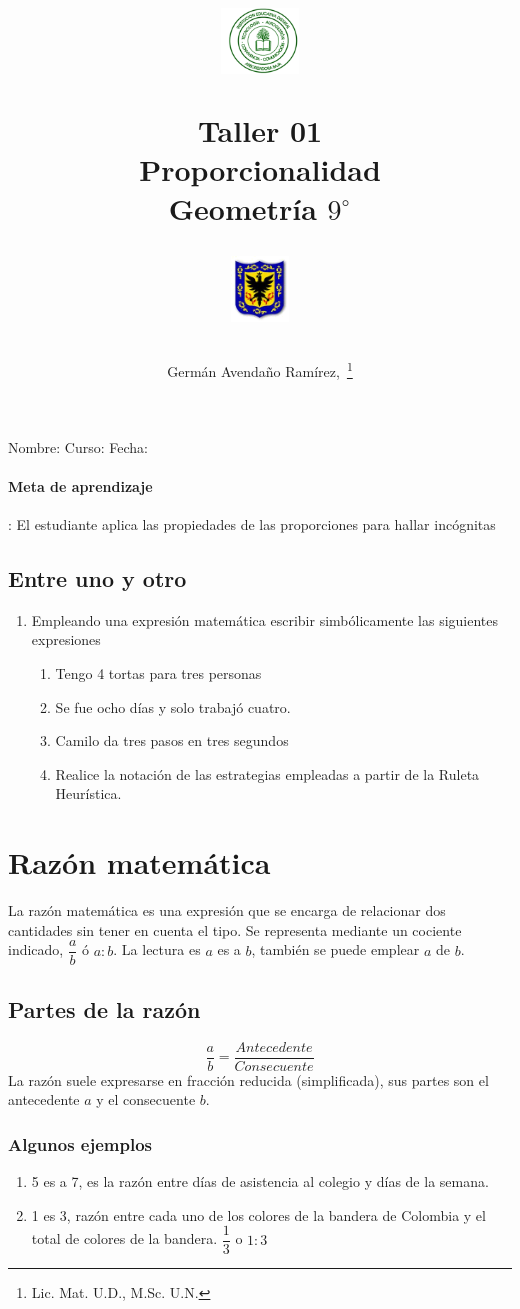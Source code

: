 \documentclass[10pt,twoside]{article}
\author{Germ\'an Avenda\~no Ram\'irez,~\thanks{Lic. Mat. U.D., M.Sc. U.N.}}
\title{\begin{minipage}{.2\textwidth}
\includegraphics[height=1.75cm]{Images/logo-colegio.png}\end{minipage}
\begin{minipage}{.55\textwidth}
\begin{center}
Taller 01\\
Proporcionalidad\\
Geometr\'{i}a $9^{\circ}$
\end{center}
\end{minipage}\hfill
\begin{minipage}{.2\textwidth}
\includegraphics[height=1.75cm]{Images/logo-sed.png} 
\end{minipage}}
\date{}
\begin{document}
\maketitle
Nombre: \hrulefill Curso: \underline{\hspace*{44pt}} Fecha: \underline{\hspace*{2.5cm}}
\paragraph*{Meta de aprendizaje}: El estudiante aplica las propiedades de las proporciones para hallar incógnitas
\subsection*{Entre uno y otro}
\begin{enumerate}
\item Empleando una expresi\'{o}n matem\'{a}tica escribir simb\'{o}licamente las siguientes expresiones
\begin{enumerate}
\item Tengo 4 tortas para tres personas
\item Se fue ocho d\'{i}as y solo trabaj\'{o} cuatro.
\item Camilo da tres pasos en tres segundos
\item Realice la notaci\'{o}n de las estrategias empleadas a partir de la Ruleta Heur\'{i}stica.
\end{enumerate}
\end{enumerate}
\section*{Raz\'{o}n matem\'{a}tica}
La razón matemática es una expresión que se encarga de relacionar dos cantidades sin tener en cuenta el tipo. Se representa mediante un cociente indicado, $\dfrac{a}{b}$ \'{o} $a:b$. La lectura es $a$ es a $b$, también se puede emplear $a$ de $b$.
\subsection*{Partes de la raz\'{o}n}
 \[\dfrac{a}{b}=\dfrac{Antecedente}{Consecuente}\]
 La razón suele expresarse en fracción reducida (simplificada), sus partes son el antecedente $a$ y  el consecuente $b$.
 \subsubsection*{Algunos ejemplos}
 \begin{enumerate}
 \item 5 es a 7, es la razón entre días de asistencia al colegio y días de la semana.
 \item 1 es 3, razón entre cada uno de los colores de la bandera de Colombia y el total de colores de la bandera. $\dfrac{1}{3}$ o $1:3$
 \end{enumerate}
\end{document}
